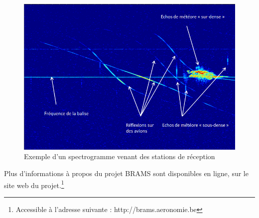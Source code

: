 \documentclass[11pt]{article}
\begin{document}
\begin{figure}[t]
    \begin{center}
        \includegraphics[scale=0.493]{spectrogramme.png}
        \caption{Exemple d'un spectrogramme venant des stations de réception}
    \end{center}
\end{figure}

\vspace{10pt}
Plus d'informations à propos du projet BRAMS sont disponibles en ligne, sur le site web du projet.\footnote{Accessible à l’adresse suivante : http://brams.aeronomie.be}

\newpage
\end{document}
